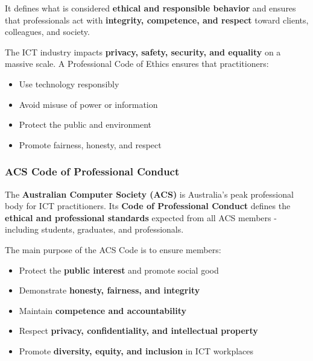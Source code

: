 It defines what is considered \textbf{ethical and responsible behavior} and ensures that professionals act with \textbf{integrity, competence, and respect} toward clients, colleagues, and society.

The ICT industry impacts \textbf{privacy, safety, security, and equality} on a massive scale. A Professional Code of Ethics ensures that practitioners:

\begin{itemize}
    \item Use technology responsibly
    \item Avoid misuse of power or information
    \item Protect the public and environment
    \item Promote fairness, honesty, and respect
\end{itemize}

\subsubsection{ACS Code of Professional Conduct}

The \textbf{Australian Computer Society (ACS)} is Australia’s peak professional body for ICT practitioners. Its \textbf{Code of Professional Conduct} defines the \textbf{ethical and professional standards} expected from all ACS members - including students, graduates, and professionals.

The main purpose of the ACS Code is to ensure members:

\begin{itemize}
    \item Protect the \textbf{public interest} and promote social good
    \item Demonstrate \textbf{honesty, fairness, and integrity}
    \item Maintain \textbf{competence and accountability}
    \item Respect \textbf{privacy, confidentiality, and intellectual property}
    \item Promote \textbf{diversity, equity, and inclusion} in ICT workplaces
\end{itemize}

